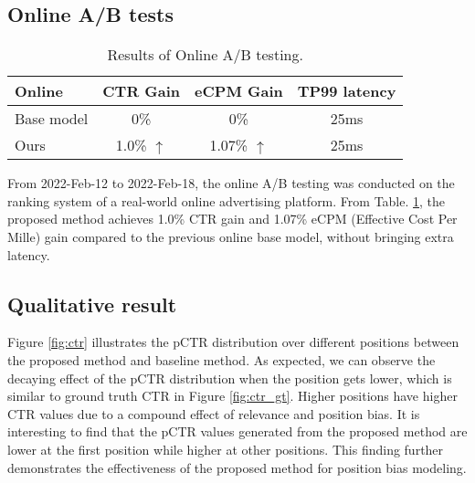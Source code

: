 \documentclass[sigconf,natbib=true,anonymous=false]{acmart}
\begin{document}
\subsection{Online A/B tests}

\begin{table}[]
\centering
\caption{Results of Online A/B testing.}
\label{tab:onlineexp}
\begin{tabular}{lccc}
\hline
Online   & CTR Gain & eCPM Gain & TP99 latency \\ \hline
Base model   & 0\%     & 0\%     & 25ms      \\ 
Ours     & 1.0\% $\uparrow$   & 1.07\% $\uparrow$  & 25ms \\ \hline
\end{tabular}
\end{table}

From 2022-Feb-12 to 2022-Feb-18, the online A/B testing was conducted on the ranking system of a real-world online advertising platform.
From Table. \ref{tab:onlineexp}, the proposed method achieves 1.0\% CTR gain and 1.07\% eCPM (Effective Cost Per Mille) gain compared to the previous online base model, without bringing extra latency.
\subsection{Qualitative result}



Figure \ref{fig:ctr} illustrates the pCTR distribution over different positions between the proposed method and baseline method.
As expected, we can observe the decaying effect of the pCTR distribution when the position gets lower, which is similar to ground truth CTR in Figure \ref{fig:ctr_gt}.
Higher positions have higher CTR values due to a compound effect of relevance and position bias.
It is interesting to find that the pCTR values generated from the proposed method are lower at the first position while higher at other positions. 
This finding further demonstrates the effectiveness of the proposed method for position bias modeling.
\end{document}

